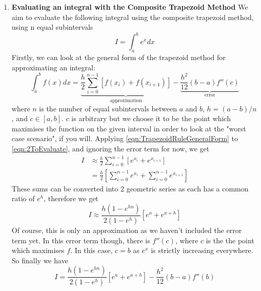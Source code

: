\documentclass[12pt]{article}
\begin{document}
\begin{enumerate}
        \item \textbf{Evaluating an integral with the Composite Trapezoid Method} \newline
        We aim to evaluate the following integral using the composite trapezoid method, using n 
        equal subintervals
        \begin{equation}
            I = \int_a^b e^xdx
            \label{eqn:2ToEvaluate}
        \end{equation}
        Firstly, we can look at the general form of the trapezoid method for approximating an 
        integral:
        \begin{equation}
            \int_a^b f(x)dx = \underbrace{\frac{h}{2}\sum_{i=0}^{n-1}[f(x_i)+f(x_{i+1})]}_\text{approximation}
            -\underbrace{\frac{h^2}{12}(b-a)f''(c)}_\text{error}
            \label{eqn:TrapezoidRuleGeneralForm}
        \end{equation}
        where $n$ is the number of equal subintervals between $a$ and $b$, $h=(a-b)/n$, and $c\in[a,b]$.
        $c$ is arbitrary but we choose it to be the point which maximises the function on the given 
        interval in order to look at the "worst case scenario", if you will. Applying \autoref{eqn:TrapezoidRuleGeneralForm} 
        to \autoref{eqn:2ToEvaluate}, and ignoring the error term for now, we get 
        \begin{align*}
            I &\approx \frac{h}{2}\sum_{i=0}^{n-1}[e^{x_i}+e^{x_{i+1}}] \\
            &= \frac{h}{2}\left[\sum_{i=0}^{n-1}e^{x_i}+\sum_{i=0}^{n-1}e^{x_{i+1}}\right]
        \end{align*}
        These sums can be converted into 2 geometric series as each has a common ratio of $e^h$, therefore 
        we get
        \begin{equation}
            I \approx \frac{h(1-e^{hn})}{2(1-e^h)}[e^a+e^{a+h}]
            \label{eqn:2SolvedNoError}
        \end{equation}
        Of course, this is only an approximation as we haven't included the error term yet. In this 
        error term though, there is $f''(c)$, where $c$ is the the point which maximises $f$. In this 
        case, $c=b$ as $e^x$ is strictly increasing everywhere. So finally we have 
        \begin{equation}
            I = \frac{h(1-e^{hn})}{2(1-e^h)}[e^a+e^{a+h}]-\frac{h^2}{12}(b-a)f''(b)
            \label{eqn:2Solved}
        \end{equation}


\end{enumerate}
\end{document}
